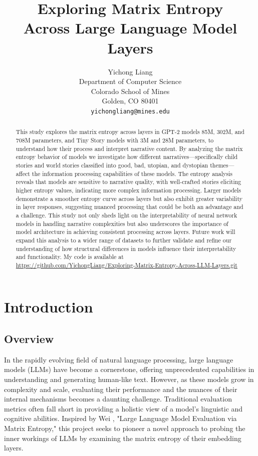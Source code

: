 \documentclass{article}
\title{Exploring Matrix Entropy\\ Across Large Language Model Layers}
\author{%
  Yichong Liang\\
  Department of Computer Science\\
  Colorado School of Mines\\
  Golden, CO 80401 \\
  \texttt{yichongliang@mines.edu} \\
}
\begin{document}
\maketitle

\begin{abstract}
This study explores the matrix entropy across layers in GPT-2 models 85M, 302M, and 708M parameters, and Tiny Story models with 3M and 28M parameters, to understand how their process and interpret narrative content. By analyzing the matrix entropy behavior of models we investigate how different narratives—specifically child stories and world stories classified into good, bad, utopian, and dystopian themes—affect the information processing capabilities of these models. The entropy analysis reveals that models are sensitive to narrative quality, with well-crafted stories eliciting higher entropy values, indicating more complex information processing. Larger models demonstrate a smoother entropy curve across layers but also exhibit greater variability in layer responses, suggesting nuanced processing that could be both an advantage and a challenge. This study not only sheds light on the interpretability of neural network models in handling narrative complexities but also underscores the importance of model architecture in achieving consistent processing across layers. Future work will expand this analysis to a wider range of datasets to further validate and refine our understanding of how structural differences in models influence their interpretability and functionality. My code is available at \url{https://github.com/YichongLiang/Exploring-Matrix-Entropy-Across-LLM-Layers.git}
\end{abstract}

\section{Introduction}


\subsection{Overview}

In the rapidly evolving field of natural language processing, large language models (LLMs) have become a cornerstone, offering unprecedented capabilities in understanding and generating human-like text. However, as these models grow in complexity and scale, evaluating their performance and the nuances of their internal mechanisms becomes a daunting challenge. Traditional evaluation metrics often fall short in providing a holistic view of a model's linguistic and cognitive abilities. Inspired by Wei \cite{wei2024}, "Large Language Model Evaluation via Matrix Entropy," this project seeks to pioneer a novel approach to probing the inner workings of LLMs by examining the matrix entropy of their embedding layers.
\end{document}
